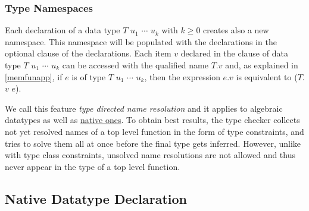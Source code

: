 \subsubsection{Type Namespaces} \label{tdnr}

Each declaration of a data type $T$ $u_1$ $\cdots$ $u_k$ with $k \ge 0$ creates also a new namespace. 
This namespace will be populated with the declarations in the optional  clause of the  declarations.
Each item $v$ declared in the  clause of data type $T$ $u_1$ $\cdots$ $u_k$  can be accessed with the qualified name $T$.$v$ and, 
as explained in \autoref{memfunapp}, 
if $e$ is of type $T$ $u_1$ $\cdots$ $u_k$, 
then the expression $e$.$v$ is equivalent to ($T$.$v$ $e$).

We call this feature \emph{type directed name resolution} and it applies to algebraic datatypes as well as \hyperref[nativedat]{native ones}. To obtain best results, the type checker collects not yet resolved names of a top level function in the form of type constraints, and tries to solve them all at once before the final type gets inferred.
However, unlike with type class constraints, unsolved name resolutions are not allowed and thus never appear in the type of a top level function.



\subsection{Native Datatype Declaration}    \label{nativedat}

